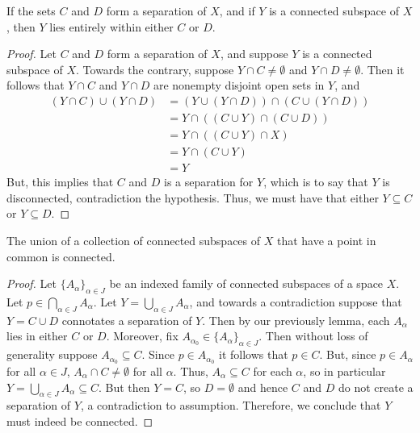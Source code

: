\documentclass[12pt, a4paper, oneside, openright, titlepage]{book}
\begin{document}
\begin{lemma}
    If the sets $C$ and $D$ form a separation of $X$, and if $Y$ is a connected subspace of $X$, then $Y$ lies entirely within either $C$ or $D$.
\end{lemma}
\begin{proof}
    Let $C$ and $D$ form a separation of $X$, and suppose $Y$ is a connected subspace of $X$. Towards the contrary, suppose $Y\cap C \neq \emptyset$ and $Y\cap D \neq \emptyset$. Then it follows that $Y\cap C$ and $Y\cap D$ are nonempty disjoint open sets in $Y$, and \begin{align*}
        (Y\cap C)\cup (Y\cap D) &= (Y\cup(Y\cap D))\cap (C\cup(Y\cap D)) \\
        &= Y\cap ((C\cup Y)\cap (C\cup D)) \\
        &= Y\cap ((C\cup Y)\cap X) \\
        &= Y\cap (C\cup Y) \\
        &= Y
    \end{align*}
    But, this implies that $C$ and $D$ is a separation for $Y$, which is to say that $Y$ is disconnected, contradiction the hypothesis. Thus, we must have that either $Y\subseteq C$ or $Y\subseteq D$.
\end{proof}


\begin{theorem}
    The union of a collection of connected subspaces of $X$ that have a point in common is connected.
\end{theorem}
\begin{proof}
    Let $\{A_{\alpha}\}_{\alpha \in J}$ be an indexed family of connected subspaces of a space $X$. Let $p \in \bigcap_{\alpha \in J}A_{\alpha}$. Let $Y = \bigcup_{\alpha \in J}A_{\alpha}$, and towards a contradiction suppose that $Y = C\cup D$ connotates a separation of $Y$. Then by our previously lemma, each $A_{\alpha}$ lies in either $C$ or $D$. Moreover, fix $A_{\alpha_0} \in \{A_{\alpha}\}_{\alpha \in J}$. Then without loss of generality suppose $A_{\alpha_0} \subseteq C$. Since $p \in A_{\alpha_0}$ it follows that $p \in C$. But, since $p \in A_{\alpha}$ for all $\alpha \in J$, $A_{\alpha} \cap C \neq \emptyset$ for all $\alpha$. Thus, $A_{\alpha} \subseteq C$ for each $\alpha$, so in particular $Y = \bigcup_{\alpha \in J}A_{\alpha} \subseteq C$. But then $Y = C$, so $D = \emptyset$ and hence $C$ and $D$ do not create a separation of $Y$, a contradiction to assumption. Therefore, we conclude that $Y$ must indeed be connected.
\end{proof}
\end{document}
